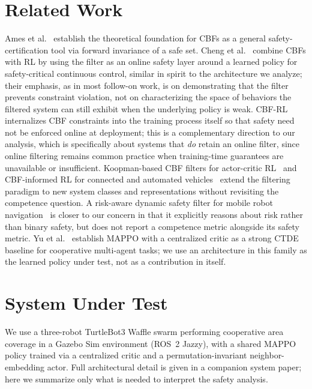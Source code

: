 \documentclass[12pt]{article}
\begin{document}
\section{Related Work}
Ames et al.~\cite{ames2019cbf} establish the theoretical foundation for CBFs
as a general safety-certification tool via forward invariance of a safe set.
Cheng et al.~\cite{cheng2019end} combine CBFs with RL by using the filter as
an online safety layer around a learned policy for safety-critical continuous
control, similar in spirit to the architecture we analyze; their emphasis,
as in most follow-on work, is on demonstrating that the filter prevents
constraint violation, not on characterizing the space of behaviors the
filtered system can still exhibit when the underlying policy is weak.
CBF-RL~\cite{cbfrl2025} internalizes CBF constraints into the training
process itself so that safety need not be enforced online at deployment; this
is a complementary direction to our analysis, which is specifically about
systems that \emph{do} retain an online filter, since online filtering
remains common practice when training-time guarantees are unavailable or
insufficient. Koopman-based CBF filters for actor-critic
RL~\cite{koopmancbf2026} and CBF-informed RL for connected and automated
vehicles~\cite{beyondsafety2026} extend the filtering paradigm to new system
classes and representations without revisiting the competence question. A
risk-aware dynamic safety filter for mobile robot
navigation~\cite{riskaware2026} is closer to our concern in that it
explicitly reasons about risk rather than binary safety, but does not report
a competence metric alongside its safety metric. Yu et al.~\cite{yu2022mappo}
establish MAPPO with a centralized critic as a strong CTDE baseline for
cooperative multi-agent tasks; we use an architecture in this family as the
learned policy under test, not as a contribution in itself.

\section{System Under Test}
\label{sec:system}
We use a three-robot TurtleBot3 Waffle swarm performing cooperative area
coverage in a Gazebo Sim environment (ROS~2 Jazzy), with a shared MAPPO
policy trained via a centralized critic and a permutation-invariant
neighbor-embedding actor. Full architectural detail is given in a companion
system paper; here we summarize only what is needed to interpret the safety
analysis.
\end{document}
